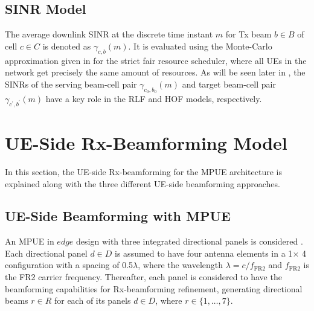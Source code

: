 \documentclass[10pt, conference]{IEEEtran}
\begin{document}
%
\subsection{SINR Model} \label{Subsection2.3}
The average downlink  SINR at the discrete time instant $m$ for Tx beam $b \in B$ of cell $c \in C$ is denoted as $\gamma_{c,b}(m)$. It is evaluated using the Monte-Carlo approximation given in \cite{b2} for the strict fair resource scheduler, where all UEs in the network get precisely the same amount of resources. As will be seen later in , the SINRs of the serving beam-cell pair $\gamma_{c_0,b_0}(m)$ and target beam-cell pair $\gamma_{c^{\prime},b^{\prime}}(m)$ have a key role in the RLF and HOF models, respectively.

%
\section{UE-Side Rx-Beamforming Model}  \label{Section3}
In this section, the UE-side Rx-beamforming for the MPUE architecture is explained along with the three different UE-side beamforming approaches.

%
\subsection{UE-Side Beamforming with MPUE} \label{Subsection3.1}
An MPUE in $edge$ design with three integrated directional panels is considered \cite{b3, b4}. Each directional panel $d \in D$ is assumed to have four antenna elements in a 1$\times$ 4 configuration with a spacing of 0.5$\lambda$, where the wavelength $\lambda = c/f_\mathrm{FR2}$  and $f_\mathrm{FR2}$ is the FR2 carrier frequency. Thereafter, each panel is considered to have the beamforming capabilities for Rx-beamforming refinement, generating directional beams $r \in R$ for each of its panels $d \in D$, where $r \in \{1,\ldots,7\}$.
\end{document}
